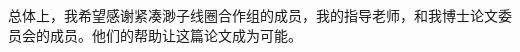 \begin{acknowledgments}
 \begin{CJK*}{UTF8}{gbsn}
总体上，我希望感谢紧凑渺子线圈合作组的成员，我的指导老师，和我博士论文委员会的成员。他们的帮助让这篇论文成为可能。
\end{CJK*}
\end{acknowledgments}